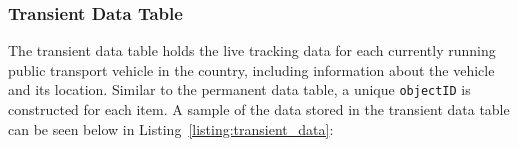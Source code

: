 \documentclass[a4paper,11pt]{report}
\begin{document}
%
%
%

\subsubsection{Transient Data Table}
The transient data table holds the live tracking data for each currently running public transport vehicle in the country, including information about the vehicle and its location.
Similar to the permanent data table, a unique \verb|objectID| is constructed for each item.
A sample of the data stored in the transient data table can be seen below in Listing~\ref{listing:transient_data}:
\end{document}
